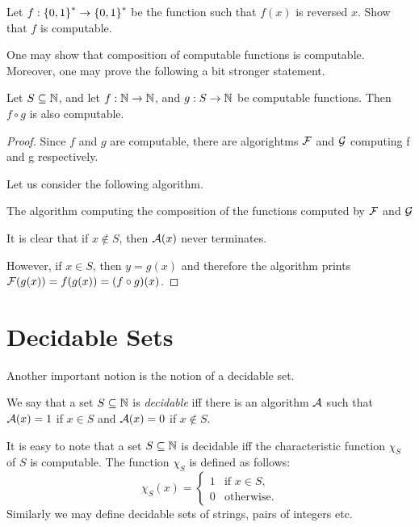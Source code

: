 \begin{exercise}
  Let $f : \strings \to \strings$ be the function such that $f(x)$ is
  reversed $x$. Show that $f$ is computable.
\end{exercise}

One may show that composition of computable functions is computable.
Moreover, one may prove the following a bit stronger statement.
\begin{theorem}
\label{theorem:composition-computable}
    Let $S \subseteq \mathbb{N}$, and let
    $f : \mathbb{N} \to \mathbb{N}$, and $g : S \to \mathbb{N}$ be computable
    functions. Then $f \circ g$ is also computable.
\end{theorem}
\begin{proof}
  Since $f$ and $g$ are computable, there are algorightms $\mathcal{F}$ and
  $\mathcal{G}$ computing f and g respectively.

  Let us consider the following algorithm.
  \begin{algorithm}
      \begin{algorithmic}[1]
          \EndFunction
      \end{algorithmic}
      \caption{The algorithm computing the composition of the functions
        computed by $\mathcal{F}$ and $\mathcal{G}$}
  \end{algorithm}
  It is clear that if $x \notin S$, then $\mathcal{A}(x)$ never terminates.

  However, if $x \in S$, then $y = g(x)$ and therefore the algorithm prints
  $\mathcal{F}(g(x)) = f(g(x)) = (f \circ g)(x)$.
\end{proof}

\section{Decidable Sets}
Another important notion is the notion of a decidable set.
\begin{definition}
    We say that a set $S \subseteq \mathbb{N}$ is \emph{decidable} iff there is
    an algorithm $\mathcal{A}$ such that
    $\mathcal{A}(x) = 1$ if $x \in S$ and $\mathcal{A}(x) = 0$ if
    $x \notin S$.
\end{definition}
It is easy to note that a set $S \subseteq \mathbb{N}$ is decidable iff the
characteristic function $\chi_S$ of $S$ is computable.
The function $\chi_S$ is defined as follows:
\[
    \chi_S(x) =
    \begin{cases}
        1 & \text{if } x \in S, \\
        0 & \text{otherwise}.
    \end{cases}
\]
Similarly we may define decidable sets of strings, pairs of integers etc.

